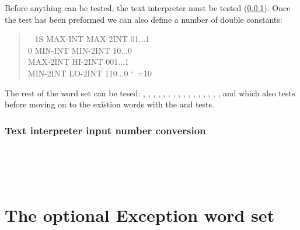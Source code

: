 Before anything can be tested, the text interpreter must be
tested (\ref{test:dbl:in}).
Once the \linebreak {} test has been preformed
we can also define a number of double constants:

\begin{quote}\ttfamily\frenchspacing\obeyspaces
~     1S MAX-INT  MAX-2INT    01...1 \\\mbox{}
      0 MIN-INT  MIN-2INT    10...0 \\
MAX-2INT        HI-2INT     001...1 \\
MIN-2INT        LO-2INT     110...0
\nonfrenchspacing\catcode`\ =10
\end{quote}

The rest of the word set can be tesed:
,
, ,
, ,
, ,
, ,
, ,
, , \linebreak
{}, ,
,  and
 which also tests  before moving on
to the existion words with the
 and  tests.

\setcounter{subsection}{3}
\setcounter{subsubsection}{1}
\subsubsection{Text interpreter input number conversion}
\label{test:dbl:in}

 \\
 \\
 \\



\section{The optional Exception word set} %


